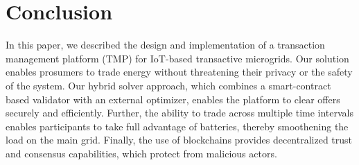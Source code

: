 \section{Conclusion}
\label{sec:conclusion}

In this paper, we described the design and implementation of a  transaction management platform (TMP) for IoT-based transactive microgrids. Our solution enables prosumers to trade energy without threatening their privacy or the safety of the system. Our hybrid solver approach, which combines a smart-contract based validator with an external optimizer, enables the platform to clear offers securely and efficiently. Further, the ability to trade across multiple time intervals enables participants to take full advantage of batteries, thereby smoothening the load on the main grid. Finally, the use of blockchains provides decentralized trust and consensus capabilities, which protect from  malicious actors.




